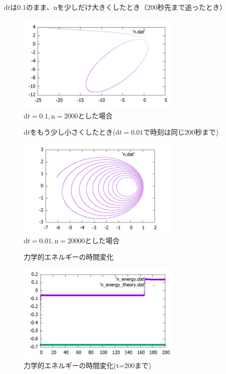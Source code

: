 \documentclass[a4paper,twoside]{jarticle}
\begin{document}
$\mathrm{d}t$は$0.1$のまま、nを少しだけ大きくしたとき（200秒先まで追ったとき）

\begin{figure}[H]
\begin{center}
\includegraphics[width=8cm]{../cpp/out/euler/euler_dt=e-1_n=2000.png}
\end{center}
\caption{$\mathrm{d}t=0.1, \mathrm{n}=2000$とした場合}
\end{figure}

\begin{figure}[H]
$\mathrm{d}t$をもう少し小さくしたとき($\mathrm{d}t=0.01$で時刻は同じ200秒まで)
\begin{center}
\includegraphics[width=8cm]{../cpp/out/euler/euler_dt=e-2_n=20000.png}
\end{center}
\caption{$\mathrm{d}t=0.01, \mathrm{n}=20000$とした場合}
\end{figure}

\begin{figure}[H]
力学的エネルギーの時間変化
\begin{center}
\includegraphics[width=8cm]{../cpp/out/euler/n_energy.png}
\end{center}
\caption{力学的エネルギーの時間変化(t=200まで)}
\end{figure}
\end{document}
